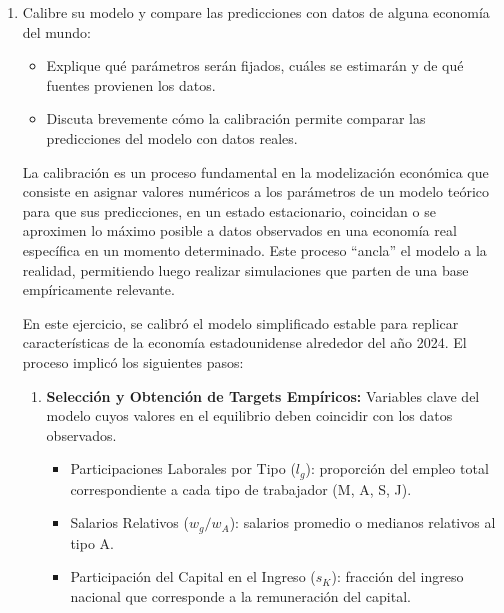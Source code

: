 \documentclass{article}
\theoremstyle{remark}
\theoremstyle{definition}
\begin{document}
\begin{enumerate}
\begin{tcolorbox}[title= Soluci\'on 5]
        \end{tcolorbox}
    
    \item Calibre su modelo y compare las predicciones con datos de alguna econom\'ia del mundo:
    \begin{itemize}
        \item Explique qué parámetros serán fijados, cuáles se estimarán y de qué fuentes provienen los datos.
        \item Discuta brevemente cómo la calibración permite comparar las predicciones del modelo con datos reales.
    \end{itemize}

        \begin{tcolorbox}[title= Soluci\'on 6]

            La calibración es un proceso fundamental en la modelización económica que consiste en asignar valores numéricos a los parámetros de un modelo teórico para que sus predicciones, en un estado estacionario, coincidan o se aproximen lo máximo posible a datos observados en una economía real específica en un momento determinado. Este proceso ``ancla'' el modelo a la realidad, permitiendo luego realizar simulaciones que parten de una base empíricamente relevante.

            En este ejercicio, se calibró el modelo simplificado estable para replicar características de la economía estadounidense alrededor del año 2024. El proceso implicó los siguientes pasos:

\begin{enumerate}
    \item \textbf{Selección y Obtención de Targets Empíricos: } Variables clave del modelo cuyos valores en el equilibrio deben coincidir con los datos observados.
    \begin{itemize}
        \item Participaciones Laborales por Tipo ($l_g$): proporción del empleo total correspondiente a cada tipo de trabajador (M, A, S, J).
        \item Salarios Relativos ($w_g/w_A$): salarios promedio o medianos relativos al tipo A.
        \item Participación del Capital en el Ingreso ($s_K$): fracción del ingreso nacional que corresponde a la remuneraci\'on del capital.
    \end{itemize}


\end{enumerate}
\end{tcolorbox}
\end{enumerate}
\end{document}
